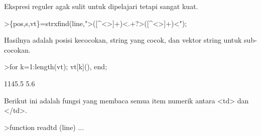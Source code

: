 \documentclass[a4paper,10pt]{article}
\begin{document}
\begin{eulernotebook}
\begin{eulercomment}
\begin{eulercomment}
\begin{eulercomment}
\begin{eulercomment}
\begin{eulercomment}
\begin{eulercomment}
\begin{eulercomment}
\begin{eulercomment}
\begin{eulercomment}
\begin{eulercomment}
\begin{eulercomment}
\begin{eulercomment}
\begin{eulercomment}
\begin{eulercomment}
\begin{eulercomment}
\begin{eulercomment}
\begin{eulercomment}
\begin{eulercomment}
\begin{eulercomment}
\begin{eulercomment}
\begin{eulercomment}
\begin{eulercomment}
\begin{eulercomment}
\begin{eulercomment}
\begin{eulercomment}
\begin{eulercomment}
\begin{eulercomment}
\begin{eulercomment}
\begin{eulercomment}
\begin{eulercomment}
\begin{eulercomment}
\begin{eulercomment}
\begin{eulercomment}
\begin{eulercomment}
\begin{eulercomment}
\begin{eulercomment}
\begin{eulercomment}
\begin{eulercomment}
\begin{eulercomment}
\begin{eulercomment}
\begin{eulercomment}
\begin{eulercomment}
\begin{eulercomment}
\begin{eulercomment}
\begin{eulercomment}
\begin{eulercomment}
\begin{eulercomment}
\begin{eulercomment}
\begin{eulercomment}
\begin{eulercomment}
\begin{eulerttcomment}
\end{eulerttcomment}
\begin{eulercomment}

Ekspresi reguler agak sulit untuk dipelajari tetapi sangat kuat.
\end{eulercomment}
\begin{eulerprompt}
>\{pos,s,vt\}=strxfind(line,">([^<>]+)<.+?>([^<>]+)<");
\end{eulerprompt}
\begin{eulercomment}
Hasilnya adalah posisi kecocokan, string yang cocok, dan vektor string
untuk sub-cocokan.
\end{eulercomment}
\begin{eulerprompt}
>for k=1:length(vt); vt[k](), end;
\end{eulerprompt}
\begin{euleroutput}
  1145.5
  5.6
\end{euleroutput}
\begin{eulercomment}
Berikut ini adalah fungsi yang membaca semua item numerik antara \textless{}td\textgreater{}
dan \textless{}/td\textgreater{}.
\end{eulercomment}
\begin{eulerprompt}
>function readtd (line) ...

\end{eulerprompt}
\end{eulercomment}
\end{eulercomment}
\end{eulercomment}
\end{eulercomment}
\end{eulercomment}
\end{eulercomment}
\end{eulercomment}
\end{eulercomment}
\end{eulercomment}
\end{eulercomment}
\end{eulercomment}
\end{eulercomment}
\end{eulercomment}
\end{eulercomment}
\end{eulercomment}
\end{eulercomment}
\end{eulercomment}
\end{eulercomment}
\end{eulercomment}
\end{eulercomment}
\end{eulercomment}
\end{eulercomment}
\end{eulercomment}
\end{eulercomment}
\end{eulercomment}
\end{eulercomment}
\end{eulercomment}
\end{eulercomment}
\end{eulercomment}
\end{eulercomment}
\end{eulercomment}
\end{eulercomment}
\end{eulercomment}
\end{eulercomment}
\end{eulercomment}
\end{eulercomment}
\end{eulercomment}
\end{eulercomment}
\end{eulercomment}
\end{eulercomment}
\end{eulercomment}
\end{eulercomment}
\end{eulercomment}
\end{eulercomment}
\end{eulercomment}
\end{eulercomment}
\end{eulercomment}
\end{eulercomment}
\end{eulercomment}
\end{eulercomment}
\end{eulernotebook}
\end{document}
